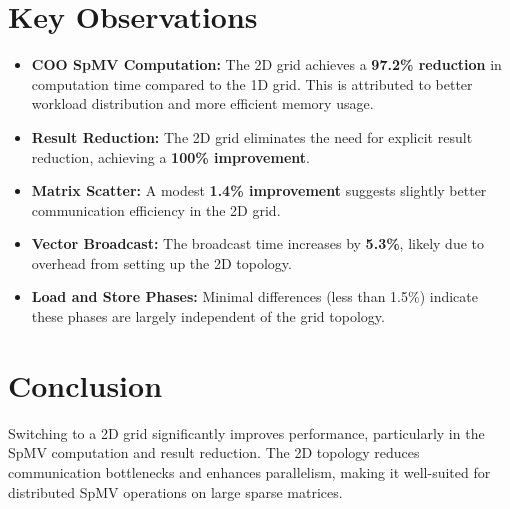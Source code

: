 \documentclass[a4paper,12pt]{article}
\begin{document}
\section*{Key Observations}
\begin{itemize}
    \item \textbf{COO SpMV Computation:} The 2D grid achieves a \textbf{97.2\% reduction} in computation time compared to the 1D grid. This is attributed to better workload distribution and more efficient memory usage.
    \item \textbf{Result Reduction:} The 2D grid eliminates the need for explicit result reduction, achieving a \textbf{100\% improvement}.
    \item \textbf{Matrix Scatter:} A modest \textbf{1.4\% improvement} suggests slightly better communication efficiency in the 2D grid.
    \item \textbf{Vector Broadcast:} The broadcast time increases by \textbf{5.3\%}, likely due to overhead from setting up the 2D topology.
    \item \textbf{Load and Store Phases:} Minimal differences (less than 1.5\%) indicate these phases are largely independent of the grid topology.
\end{itemize}

\section*{Conclusion}
Switching to a 2D grid significantly improves performance, particularly in the SpMV computation and result reduction. The 2D topology reduces communication bottlenecks and enhances parallelism, making it well-suited for distributed SpMV operations on large sparse matrices.
\end{document}
